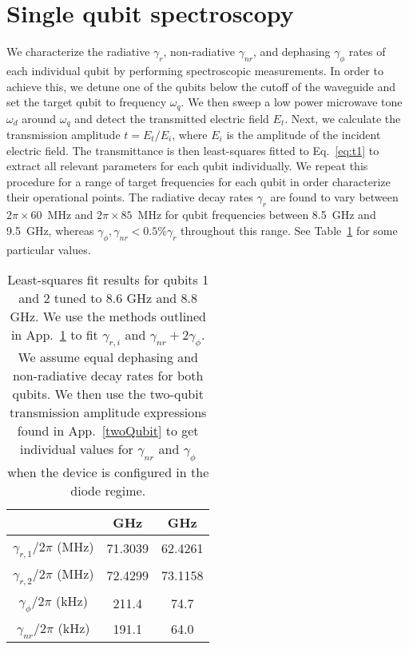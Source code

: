 \documentclass[pra, twocolumn, amsmath, amssymb, notitlepage, longbibliography, showpacs, superscriptaddress]{revtex4-1}
\newcommand{\ii}{\mathrm{i}}			             			%
\begin{document}
\section{Single qubit spectroscopy}
\label{singleQubitSpec}

We characterize the radiative $\gamma_r$,
non-radiative $\gamma_{nr}$, and dephasing $\gamma_\phi$ rates
of each individual qubit by performing spectroscopic measurements. 
In order to achieve this, we detune one of the qubits below the cutoff 
of the waveguide and set the target qubit to frequency $\omega_q$.
We then sweep a low power microwave tone $\omega_d$ around $\omega_q$
and detect the transmitted electric field $E_t$. Next, we
calculate the transmission amplitude $t=E_t/E_i$, 
where $E_i$ is the amplitude of the incident electric field. 
The transmittance is then least-squares fitted to Eq.~\eqref{eq:t1} to extract 
all relevant parameters for each qubit individually. 
We repeat this procedure for a range of target frequencies for 
each qubit in order characterize their operational points.
The radiative decay rates $\gamma_r$ are found to vary between $2\pi\times 60$~MHz and $2\pi\times 85$~MHz
for qubit frequencies between 8.5~GHz and 9.5~GHz, 
whereas $\gamma_{\phi}, \gamma_{nr} < 0.5\% \gamma_{r}$
throughout this range. See Table~\ref{TableSingleQubitSweep} for some particular values.

\begin{table}[]
\centering
\begin{tabular}{ccc}
     & \quad  8.6 GHz  \quad & \quad 8.8 GHz \quad \\ \hline
$\gamma_{r,1}/2\pi$ (MHz)  &   71.3039   &  62.4261      \\ 
$\gamma_{r,2}/2\pi$ (MHz)  &   72.4299   &  73.1158      \\ 
$\gamma_{\phi}/2\pi$ (kHz)  &   211.4   &  74.7      \\ 
$\gamma_{nr}/2\pi$ (kHz)  &   191.1   &  64.0      \\ 
\hline
\end{tabular}
\caption{Least-squares fit results for qubits 1 and 2 
tuned to 8.6 GHz and 8.8 GHz. 
We use the methods outlined in App.~\ref{singleQubitSpec}
to fit $\gamma_{r,i}$ and $\gamma_{nr}+2\gamma_{\phi}$. 
We assume equal dephasing and non-radiative decay rates for both qubits. 
We then use the two-qubit transmission amplitude expressions 
found in App.~\ref{twoQubit} to get individual values
for $\gamma_{nr}$ and $\gamma_{\phi}$ when the 
device is configured in the diode regime.
}
\label{TableSingleQubitSweep}
\end{table}
\end{document}
